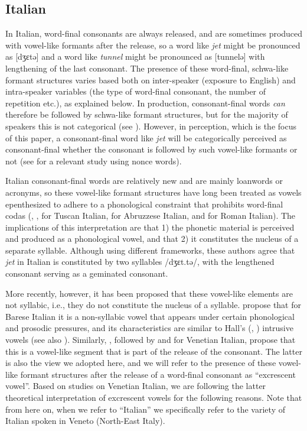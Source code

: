 \documentclass[output=paper,colorlinks,citecolor=brown]{langscibook}
\begin{document}
\subsection{Italian}\label{hamann:it}
In Italian, word-final consonants are always released, and are sometimes produced with vowel-like formants after the release, so a word like \textit{jet} might be pronounced as [dʒɛtə] and a word like \textit{tunnel} might be pronounced as [tunnelə] with lengthening of the last consonant. The presence of these word-final, schwa-like formant structures varies based both on inter-speaker (exposure to English) and intra-speaker variables (the type of word-final consonant, the number of repetition etc.), as explained below. In production, consonant-final words \textit{can} therefore be followed by schwa-like formant structures, but for the majority of speakers this is not categorical (see \cite{Miattoetal2019,Miatto2022}). However, in perception, which is the focus of this paper, a consonant-final word like \textit{jet} will be categorically perceived as consonant-final whether the consonant is followed by such vowel-like formants or not (see \cite{Miatto2020} for a relevant study using nonce words).

Italian consonant-final words are relatively new and are mainly loanwords or acronyms, so these vowel-like formant structures have long been treated as vowels epenthesized to adhere to a phonological constraint that prohibits word-final codas (\cite{Bafile2002}, \citeyear{Bafile2003}, \citeyear{Bafile2005} for Tuscan Italian, \cite{Passino2008} for Abruzzese Italian, and \cite{Broniś2016} for Roman Italian). The implications of this interpretation are that 1) the phonetic material is perceived and produced as a phonological vowel, and that 2) it constitutes the nucleus of a separate syllable. Although using different frameworks, these authors agree that \textit{jet} in Italian is constituted by two syllables /dʒɛt.tə/, with the lengthened consonant serving as a geminated consonant. 

More recently, however, it has been proposed that these vowel-like elements are not syllabic, i.e., they do not constitute the nucleus of a syllable. \citet{Griceetal2015Italian} propose that for Barese Italian it is a non-syllabic vowel that appears under certain phonological and prosodic pressures, and its characteristics are similar to Hall’s (\citeyear{Hall2006}, \citeyear{Hall2011}) intrusive vowels (see also ). Similarly, \citet{Repetti2012}, followed by \citet{Miattoetal2019} and \citet{Miatto2020, Miatto2022} for Venetian Italian, propose that this is a vowel-like segment that is part of the release of the consonant. The latter is also the view we adopted here, and we will refer to the presence of these vowel-like formant structures after the release of a word-final consonant as “excrescent vowel”. Based on studies on Venetian Italian, we are following the latter theoretical interpretation of excrescent vowels for the following reasons. Note that from here on, when we refer to “Italian” we specifically refer to the variety of Italian spoken in Veneto (North-East Italy).
\end{document}
